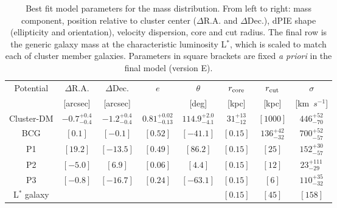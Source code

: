 \documentclass[12pt]{article}
\begin{document}
\begin{table}[ht]
    \centering
    \begin{tabular}{c|c|c|c|c|c|c|c|}
    Potential & $\Delta$R.A. & $\Delta$Dec. & $e$ & $\theta$ & $r_{\rm core}$ & $r_{\rm cut}$ & $\sigma$ \\
                  & [arcsec] & [arcsec] & & [deg] & [kpc] & [kpc] & [km\ $s^{-1}$] \\
\midrule
Cluster-DM & $ -0.7^{+0.4}_{-0.4}$ & $ -1.2^{+0.4}_{-0.4}$ & $ 0.81^{+0.02}_{-0.13}$ & $114.9^{+2.0}_{-4.1}$ & $31^{+13}_{-12}$ & $[1000]$ & $446^{+52}_{-70}$ \\
BCG            & $[  0.1]$ & $[ -0.1]$ & $[0.52]$ & $[-41.1]$ & $[0.15]$ & $136^{+42}_{-32}$  & $700^{+52}_{-57}$ \\
P1             & $[ 19.2]$ & $[-13.5]$ & $[0.49]$ & $[ 86.2]$ & $[0.15]$ & $[25]$            &  $152^{+30}_{-57}$ \\
P2             & $[ -5.0]$ & $[  6.9]$ & $[0.06]$ & $[  4.4]$ & $[0.15]$ & $[12]$            &  $23^{+111}_{-29}$ \\
P3             & $[ -0.8]$ & $[-16.7]$ & $[0.24]$ & $[-63.1]$ & $[0.15]$ & $[6]$             &  $110^{+35}_{-32}$ \\
L$^{*}$ galaxy &           &           &          &           & $[0.15]$ & $[45]$            & $[158]$\\
    \end{tabular}
    \caption{Best fit model parameters for the mass distribution. From left to right: mass component, position relative to cluster center ($\Delta$R.A. and $\Delta$Dec.), dPIE shape (ellipticity and orientation), velocity dispersion, core and cut radius. The final row  is the generic galaxy mass at the characteristic luminosity L$^*$, which is scaled to match each of cluster member galaxies.  Parameters in square brackets are fixed {\it a priori} in the final model (version E). }
    \label{tab:massmodel}
\end{table}
\end{document}
